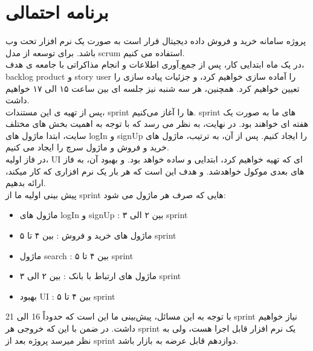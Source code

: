 \documentclass{article}
\begin{document}
	\section{برنامه احتمالی}
	پروژه سامانه خرید و فروش داده دیجیتال قرار است به صورت یک نرم افزار تحت وب باشد. برای توسعه از مدل scrum  استفاده می کنیم.
	\\
در یک ماه ابتدایی کار، پس از جمع ِآوری اطلاعات و انجام مذاکراتی با جامعه ی هدف، backlog product و story user را آماده سازی خواهیم کرد، و جزئیات پیاده سازی را تعیین خواهیم کرد. همچنین، هر سه شنبه نیز جلسه ای بین ساعت ۱۵ الی ۱۷ خواهیم داشت‌.
	\\
پس از تهیه ی این مستندات، sprint ها را آغاز می‌کنیم. sprint های ما به صورت یک هفته ای خواهند بود.
در نهایت، به نظر می رسد که با توجه به‌ اهمیت بخش های مختلف سایت، ابتدا ماژول های logIn و signUp را ایجاد کنیم. پس از آن، به ترتیب، ماژول های خرید و فروش و ماژول سرچ را ایجاد می کنیم. 
	\\
در فاز اولیه، UI ای که تهیه خواهیم کرد، ابتدایی و ساده خواهد بود. و بهبود آن، به فاز های بعدی موکول خواهدشد. و هدف این است که هر بار یک نرم افزاری که کار میکند، ارائه بدهیم.
	\\
پیش بینی اولیه ما از sprint هایی که صرف هر ماژول می شود:

	\begin{itemize}
		\item ماژول های logIn و signUp :  
		 بین ۲ الی ۳ sprint
		
		\item ماژول های خرید و فروش : 
		بین ۴ تا ۵ sprint
		
		\item ماژول search : 
		بین ۴ تا ۵ sprint
		
		\item  ماژول های ارتباط با بانک : 
		بین ۲ الی ۳ sprint
		
		\item بهبود UI :  
		بین ۴ تا ۵ sprint
		
	\end{itemize}
	با توجه به این مسائل، پیش‌بینی ما این است که حدوداً 16 الی 21 sprint نیاز خواهیم داشت.
	در ضمن با این که خروجی هر sprint یک نرم افزار قابل اجرا هست، ولی به نظر میرسد پروژه بعد از sprint دوازدهم قابل عرضه به بازار باشد.
	
\end{document}
